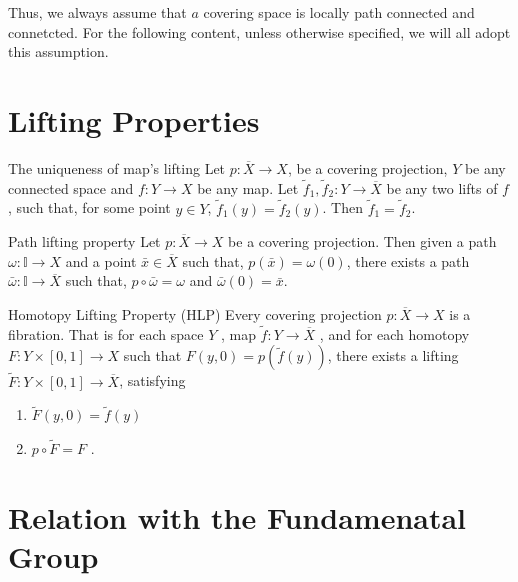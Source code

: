 \documentclass[../main.tex]{subfiles}
\begin{document}
\begin{remark}
    Thus, we always assume that \(  a   \) covering space is locally path connected and connetcted. For the following content, unless otherwise specified, we will all adopt this assumption.
\end{remark}

\section{Lifting Properties}

\begin{theorem}{The uniqueness of map's lifting}{}
Let $p : \overline{X} \to X$, be a covering projection, $Y$ be any connected space and $f : Y \to X$ be any map. Let $\tilde{f}_1, \tilde{f}_2 : Y \to \overline{X}$ be any two lifts of $f$, such that, for some point $y \in Y$, $\tilde{f}_{1}\left( y \right)=  \tilde{f}_2(y)$. Then $\tilde{f}_1 = \tilde{f}_2$.
\end{theorem}

\begin{theorem}{Path lifting property}{}
Let $p : \overline{X} \to X$ be a covering projection. Then given a path $\omega : \mathbb{I} \to X$ and a point $\bar{x} \in \overline{X}$ such that, $p(\bar{x}) = \omega(0)$, there exists a path $\bar{\omega} : \mathbb{I} \to \overline{X}$ such that, $p \circ \bar{\omega} = \omega$ and $\bar{\omega}(0) = \bar{x}$.
\end{theorem}

\begin{theorem}{Homotopy Lifting Property (HLP)}{}
    Every covering projection \(  p:\overline{X}\to X  \) is a fibration. That is for each space \(  Y  \) ,   map \(  \tilde{f}:Y\to   \overline{X}  \) , and for each homotopy \(  F: Y\times [0,1]\to X  \) such that \(  F\left( y,0 \right)= p\left( \tilde{f}\left( y \right)  \right)    \), there exists a lifting \(  \tilde{F}: Y\times \left[ 0,1 \right]\to  \overline{X}   \), satisfying
    \begin{enumerate}
        \item \(  \tilde{F}\left( y,0 \right)= \tilde{f}\left( y \right)    \)
        \item \(  p\circ \tilde{F}= F  \)  .
    \end{enumerate}
        
\end{theorem}

\section{Relation with the Fundamenatal Group}
\end{document}
